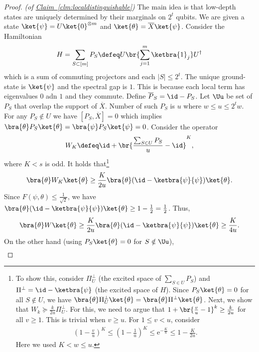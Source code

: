 \documentclass[11pt]{article}
\newcommand{\expref}[2]{\texorpdfstring{\hyperref[#2]{#1~\ref{#2}}}{#1~\ref{#2}}}
\newcommand{\eee}{\mathrm e}
\begin{document}
\begin{proof}\textit{(of \expref{Claim}{clm:localdistinguishable})}
The main idea is that low-depth states are uniquely determined by their marginals on $2^t$ qubits. We are given a state $\ket{\psi}=U\ket{0}^{\otimes m}$ and $\ket{\theta}=\overline{X}\ket{\psi}$. Consider the Hamiltonian 
\begin{align}H=\sum_{S\subset [m]}P_S \defeq U\br{\sum_{j=1}^m \ketbra{1}_j}U^{\dagger}
\end{align}
which is a sum of commuting projectors and each $|S|\leq 2^t$. The unique ground-state is $\ket{\psi}$ and the spectral gap is $1$. This is because each local term has eigenvalues $0$ adn $1$ and they commute. Define $\overline{P}_S=\id-P_S$. Let $\Uu$ be set of $P_S$ that overlap the support of $\overline{X}$. Number of such $P_S$ is $u$ where $w\leq u\leq 2^t w$. For any $P_S\notin U$ we have $[P_S, \overline{X}]=0$ which implies $\bra{\theta}P_S\ket{\theta}=\bra{\psi}P_S\ket{\psi}=0$. Consider the operator
\begin{align}W_K \defeq \id + \br{\frac{\sum_{S\in U}P_S}{u}-\id}^K ,\end{align}
where $K< s$ is odd. It holds that\footnote{To show this, consider $\Pi^{\perp}_U$ (the excited space of $\sum_{S\in U}P_S$) and $\Pi^{\perp}=\id-\ketbra{\psi}$ (the excited space of $H$). Since $P_S\ket{\theta}=0$ for all $S\notin U$, we have $\bra{\theta}\Pi^{\perp}_U\ket{\theta}=\bra{\theta}\Pi^{\perp}\ket{\theta}$. Next, we show that $W_k\succeq \frac{k}{2u}\Pi^{\perp}_U$. For this, we need to argue that $1+\br{\frac{v}{u}-1}^k \geq \frac{k}{2u}$ for all $v\geq 1$. This is trivial when $v\geq u$. For $1\leq v < u$, consider 
\begin{align}
(1-\frac{v}{u})^K\leq (1-\frac{1}{u})^K\leq \eee^{-\frac{K}{u}}\leq 1-\frac{K}{2u}.
\end{align}Here we used $K<w\leq u$.} \begin{align}\bra{\theta}W_K\ket{\theta} \geq \frac{K}{2u}\bra{\theta}(\id - \ketbra{\psi}{\psi})\ket{\theta}.\end{align}
Since $F(\psi,\theta)\leq \frac{1}{\sqrt{2}}$, we have $\bra{\theta} (\id-\ketbra{\psi}{\psi}) \ket{\theta} \geq 1-\frac{1}{2}= \frac{1}{2}$. Thus, 
\begin{align}\bra{\theta}W\ket{\theta} \geq \frac{K}{2u}\bra{\theta} (\id-\ketbra{\psi}{\psi}) \ket{\theta} \geq \frac{K}{4u}.\end{align}
On the other hand (using $P_S\ket{\theta}=0$ for $S\notin \Uu$), 
\begin{align}

\end{align}
\end{proof}
\end{document}
